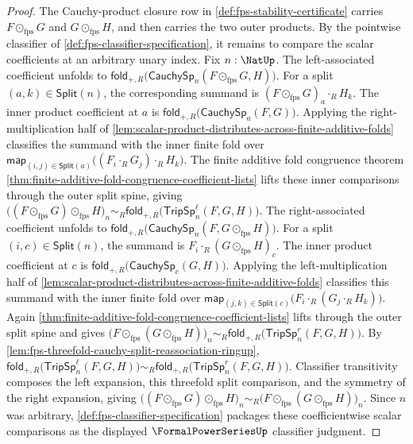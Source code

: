 \begin{proof}
The Cauchy-product closure row in \autoref{def:fps-stability-certificate} carries $F\odot_{\mathrm{fps}}G$ and $G\odot_{\mathrm{fps}}H$, and then carries the two outer products. By the pointwise classifier of \autoref{def:fps-classifier-specification}, it remains to compare the scalar coefficients at an arbitrary unary index.
Fix $n:\NatUp$. The left-associated coefficient unfolds to $\mathsf{fold}_{+,R}\bigl(\mathsf{CauchySp}_n(F\odot_{\mathrm{fps}}G,H)\bigr)$. For a split $(a,k)\in\mathsf{Split}(n)$, the corresponding summand is $(F\odot_{\mathrm{fps}}G)_a\cdot_R H_k$. The inner product coefficient at $a$ is $\mathsf{fold}_{+,R}\bigl(\mathsf{CauchySp}_a(F,G)\bigr)$. Applying the right-multiplication half of \autoref{lem:scalar-product-distributes-across-finite-additive-folds} classifies the summand with the inner finite fold over $\mathsf{map}_{(i,j)\in\mathsf{Split}(a)}\bigl((F_i\cdot_R G_j)\cdot_R H_k\bigr)$. The finite additive fold congruence theorem \autoref{thm:finite-additive-fold-congruence-coefficient-lists} lifts these inner comparisons through the outer split spine, giving $\bigl((F\odot_{\mathrm{fps}}G)\odot_{\mathrm{fps}}H\bigr)_n\sim_R\mathsf{fold}_{+,R}\bigl(\mathsf{TripSp}^{\ell}_n(F,G,H)\bigr)$.
The right-associated coefficient unfolds to $\mathsf{fold}_{+,R}\bigl(\mathsf{CauchySp}_n(F,G\odot_{\mathrm{fps}}H)\bigr)$. For a split $(i,c)\in\mathsf{Split}(n)$, the summand is $F_i\cdot_R(G\odot_{\mathrm{fps}}H)_c$. The inner product coefficient at $c$ is $\mathsf{fold}_{+,R}\bigl(\mathsf{CauchySp}_c(G,H)\bigr)$. Applying the left-multiplication half of \autoref{lem:scalar-product-distributes-across-finite-additive-folds} classifies this summand with the inner finite fold over $\mathsf{map}_{(j,k)\in\mathsf{Split}(c)}\bigl(F_i\cdot_R(G_j\cdot_R H_k)\bigr)$. Again \autoref{thm:finite-additive-fold-congruence-coefficient-lists} lifts through the outer split spine and gives $\bigl(F\odot_{\mathrm{fps}}(G\odot_{\mathrm{fps}}H)\bigr)_n\sim_R\mathsf{fold}_{+,R}\bigl(\mathsf{TripSp}^{r}_n(F,G,H)\bigr)$.
By \autoref{lem:fps-threefold-cauchy-split-reassociation-ringup}, $\mathsf{fold}_{+,R}\bigl(\mathsf{TripSp}^{\ell}_n(F,G,H)\bigr)\sim_R\mathsf{fold}_{+,R}\bigl(\mathsf{TripSp}^{r}_n(F,G,H)\bigr)$. Classifier transitivity composes the left expansion, this threefold split comparison, and the symmetry of the right expansion, giving $\bigl((F\odot_{\mathrm{fps}}G)\odot_{\mathrm{fps}}H\bigr)_n\sim_R\bigl(F\odot_{\mathrm{fps}}(G\odot_{\mathrm{fps}}H)\bigr)_n$. Since $n$ was arbitrary, \autoref{def:fps-classifier-specification} packages these coefficientwise scalar comparisons as the displayed $\FormalPowerSeriesUp$ classifier judgment.
\end{proof}

